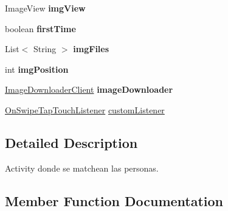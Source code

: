 \begin{DoxyCompactItemize}
\item 
Image\+View {\bfseries img\+View}\hypertarget{classcom_1_1example_1_1sebastian_1_1tindertp_1_1MatchingActivity_a5532c8d8d82ed2b0c50d14fb63bfb9db}{}\label{classcom_1_1example_1_1sebastian_1_1tindertp_1_1MatchingActivity_a5532c8d8d82ed2b0c50d14fb63bfb9db}

\item 
boolean {\bfseries first\+Time}\hypertarget{classcom_1_1example_1_1sebastian_1_1tindertp_1_1MatchingActivity_a4800157a677b06c48697605a15f2187e}{}\label{classcom_1_1example_1_1sebastian_1_1tindertp_1_1MatchingActivity_a4800157a677b06c48697605a15f2187e}

\item 
List$<$ String $>$ {\bfseries img\+Files}\hypertarget{classcom_1_1example_1_1sebastian_1_1tindertp_1_1MatchingActivity_aeca0d5556d8ac1c212281255cec31c88}{}\label{classcom_1_1example_1_1sebastian_1_1tindertp_1_1MatchingActivity_aeca0d5556d8ac1c212281255cec31c88}

\item 
int {\bfseries img\+Position}\hypertarget{classcom_1_1example_1_1sebastian_1_1tindertp_1_1MatchingActivity_a80ec2008b1cc0476a276940275f3c7be}{}\label{classcom_1_1example_1_1sebastian_1_1tindertp_1_1MatchingActivity_a80ec2008b1cc0476a276940275f3c7be}

\item 
\hyperlink{classcom_1_1example_1_1sebastian_1_1tindertp_1_1internetTools_1_1ImageDownloaderClient}{Image\+Downloader\+Client} {\bfseries image\+Downloader}\hypertarget{classcom_1_1example_1_1sebastian_1_1tindertp_1_1MatchingActivity_a858a71eda8dfd80d1cb3d12f09f18c6c}{}\label{classcom_1_1example_1_1sebastian_1_1tindertp_1_1MatchingActivity_a858a71eda8dfd80d1cb3d12f09f18c6c}

\item 
\hyperlink{classcom_1_1example_1_1sebastian_1_1tindertp_1_1gestureTools_1_1OnSwipeTapTouchListener}{On\+Swipe\+Tap\+Touch\+Listener} \hyperlink{classcom_1_1example_1_1sebastian_1_1tindertp_1_1MatchingActivity_af682ff57645185f224a00c986547efe0}{custom\+Listener}
\end{DoxyCompactItemize}


\subsection{Detailed Description}
Activity donde se matchean las personas. 

\subsection{Member Function Documentation}
